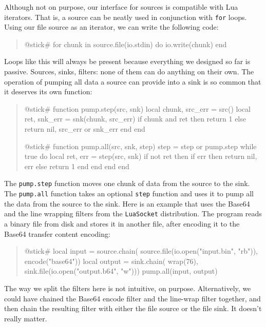 \documentclass[10pt]{article}
\begin{document}
Although not on purpose, our interface for sources is
compatible with Lua iterators. That is, a source can be
neatly used in conjunction with \texttt{for} loops.  Using
our file source as an iterator, we can write the following
code:
\begin{quote}
\begin{lua}
@stick#
for chunk in source.file(io.stdin) do
  io.write(chunk)
end
%
\end{lua}
\end{quote}

Loops like this will always be present because everything
we designed so far is passive. Sources, sinks, filters: none
of them can do anything on their own. The operation of
pumping all data a source can provide into a sink is so
common that it deserves its own function:
\begin{quote}
\begin{lua}
@stick#
function pump.step(src, snk)
  local chunk, src_err = src()
  local ret, snk_err = snk(chunk, src_err)
  if chunk and ret then return 1
  else return nil, src_err or snk_err end
end
%

@stick#
function pump.all(src, snk, step)
    step = step or pump.step
    while true do
        local ret, err = step(src, snk)
        if not ret then
            if err then return nil, err
            else return 1 end
        end
    end
end
%
\end{lua}
\end{quote}

The \texttt{pump.step} function moves one chunk of data from
the source to the sink. The \texttt{pump.all} function takes
an optional \texttt{step} function and uses it to pump all the
data from the source to the sink.
Here is an example that uses the Base64 and the
line wrapping filters from the \texttt{LuaSocket}
distribution.  The program reads a binary file from
disk and stores it in another file, after encoding it to the
Base64 transfer content encoding:
\begin{quote}
\begin{lua}
@stick#
local input = source.chain(
  source.file(io.open("input.bin", "rb")),
  encode("base64"))
local output = sink.chain(
  wrap(76),
  sink.file(io.open("output.b64", "w")))
pump.all(input, output)
%
\end{lua}
\end{quote}

The way we split the filters here is not intuitive, on
purpose.  Alternatively, we could have chained the Base64
encode filter and the line-wrap filter together, and then
chain the resulting filter with either the file source or
the file sink. It doesn't really matter.
\end{document}
